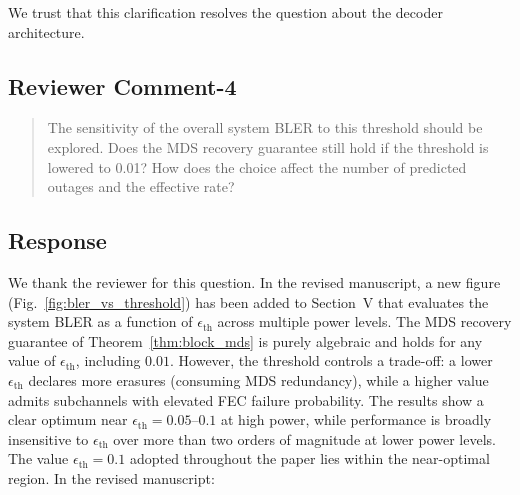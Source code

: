 We trust that this clarification resolves the question about the decoder architecture.


\subsection{Reviewer Comment-4}



\begin{mdframed}
\begin{quote}

The sensitivity of the overall system BLER to this threshold should be explored. Does the MDS recovery guarantee still hold if the threshold is lowered to 0.01? How does the choice affect the number of predicted outages and the effective rate?
\end{quote}

\end{mdframed}


\subsection{Response}

We thank the reviewer for this question. In the revised manuscript, a new figure (Fig.~\ref{fig:bler_vs_threshold}) has been added to Section~V that evaluates the system BLER as a function of $\epsilon_{\mathrm{th}}$ across multiple power levels. The MDS recovery guarantee of Theorem~\ref{thm:block_mds} is purely algebraic and holds for any value of $\epsilon_{\mathrm{th}}$, including $0.01$. However, the threshold controls a trade-off: a lower $\epsilon_{\mathrm{th}}$ declares more erasures (consuming MDS redundancy), while a higher value admits subchannels with elevated FEC failure probability. The results show a clear optimum near $\epsilon_{\mathrm{th}} = 0.05$--$0.1$ at high power, while performance is broadly insensitive to $\epsilon_{\mathrm{th}}$ over more than two orders of magnitude at lower power levels. The value $\epsilon_{\mathrm{th}} = 0.1$ adopted throughout the paper lies within the near-optimal region. In the revised manuscript:

